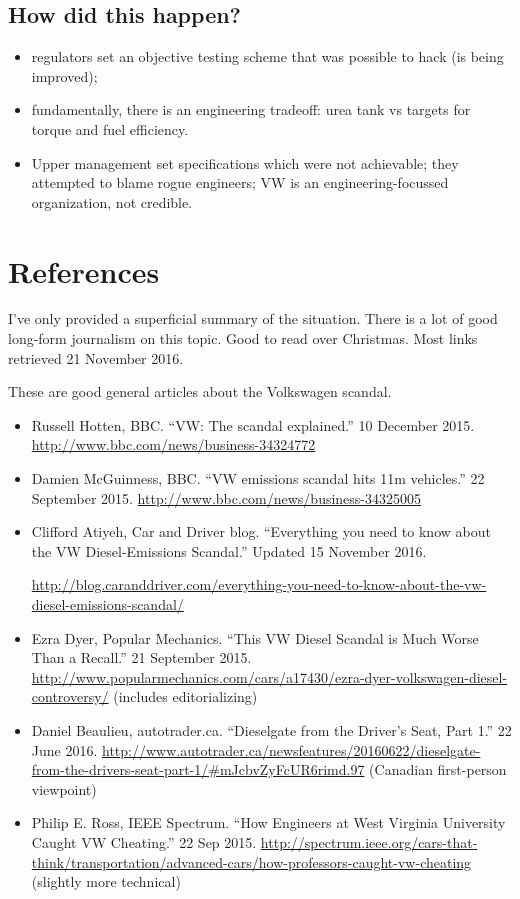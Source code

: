 \documentclass[11pt]{article}
\begin{document}
\subsection*{How did this happen?}
\begin{itemize}[noitemsep]
\item regulators set an objective testing scheme that was possible to hack (is being improved);
\item fundamentally, there is an engineering tradeoff: urea tank vs targets for torque and fuel efficiency.
\item Upper management set specifications which were not achievable; they attempted to blame rogue engineers; VW is an engineering-focussed organization, not credible.
\end{itemize}


\newpage
\section*{References}

I've only provided a superficial summary of the situation. There is a
lot of good long-form journalism on this topic. Good to read over Christmas.
Most links retrieved 21 November 2016.

\noindent
These are good general articles about the Volkswagen scandal.

\begin{itemize}
\item Russell Hotten, BBC. ``VW: The scandal explained.'' 10 December 2015. \url{http://www.bbc.com/news/business-34324772}
\item Damien McGuinness, BBC. ``VW emissions scandal hits 11m vehicles.'' 22 September 2015. \url{http://www.bbc.com/news/business-34325005}
\item Clifford Atiyeh, Car and Driver blog. ``Everything you need to know about the VW Diesel-Emissions Scandal.'' Updated 15 November 2016. 

\url{http://blog.caranddriver.com/everything-you-need-to-know-about-the-vw-diesel-emissions-scandal/}
\item Ezra Dyer, Popular Mechanics. ``This VW Diesel Scandal is Much Worse Than a Recall.'' 21 September 2015. \url{http://www.popularmechanics.com/cars/a17430/ezra-dyer-volkswagen-diesel-controversy/} (includes editorializing)
\item Daniel Beaulieu, autotrader.ca. ``Dieselgate from the Driver's Seat, Part 1.'' 22 June 2016. \url{http://www.autotrader.ca/newsfeatures/20160622/dieselgate-from-the-drivers-seat-part-1/#mJcbvZyFcUR6rimd.97} (Canadian first-person viewpoint)
\item Philip E. Ross, IEEE Spectrum. ``How Engineers at West Virginia University Caught VW Cheating.'' 22 Sep 2015. \url{http://spectrum.ieee.org/cars-that-think/transportation/advanced-cars/how-professors-caught-vw-cheating} (slightly more technical)
\end{itemize}
\end{document}
